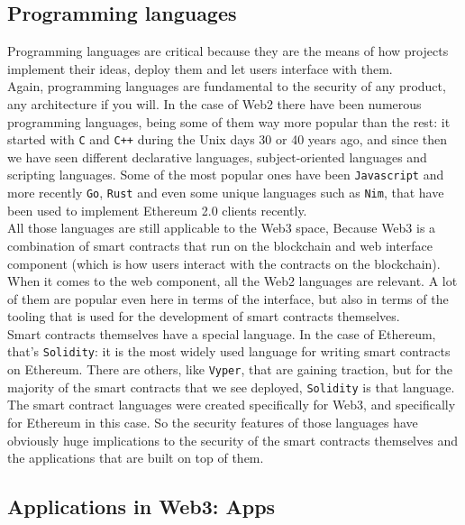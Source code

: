 \subsection*{Programming languages}
Programming languages are critical because they are the means of how projects implement their ideas, deploy them and let users interface with them.\\

Again, programming languages are fundamental to the security of any product, any architecture if you will.
In the case of Web2 there have been numerous programming languages, being some of them way more popular than the rest: it started with \texttt{C} and \texttt{C++} during the Unix days 30 or 40 years ago, and since then we have seen different declarative languages, subject-oriented languages and scripting languages.
Some of the most popular ones have been \texttt{Javascript} and more recently \texttt{Go}, \texttt{Rust} and even some unique languages such as \texttt{Nim}, that have been used to implement Ethereum 2.0 clients recently.\\

All those languages are still applicable to the Web3 space, Because Web3 is a combination of smart contracts that run on the blockchain and web interface component (which is how users interact with the contracts on the blockchain).
When it comes to the web component, all the Web2 languages are relevant.
A lot of them are popular even here in terms of the interface, but also in terms of the tooling that is used for the development of smart contracts themselves.\\

Smart contracts themselves have a special language.
In the case of Ethereum, that's \texttt{Solidity}: it is the most widely used language for writing smart contracts on Ethereum.
There are others, like \texttt{Vyper}, that are gaining traction, but for the majority of the smart contracts that we see deployed, \texttt{Solidity} is that language.\\

The smart contract languages were created specifically for Web3, and specifically for Ethereum in this case. So the security features of those languages have obviously huge implications to the security of the smart contracts themselves and the applications that are built on top of them.

\subsection*{Applications in Web3: \DJ Apps}

